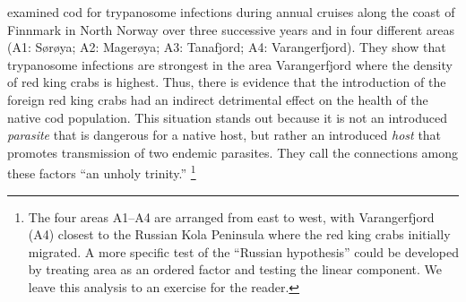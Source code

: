 \documentclass[11pt]{book}\usepackage[]{graphicx}\usepackage[]{color}
\begin{document}
\citet{Hemmingsen-etal:2005} examined cod for trypanosome infections during annual cruises along the coast of Finnmark in North Norway over three successive years and in four different areas
(A1: S{\o}r{\o}ya; A2: Mager{\o}ya; A3: Tanafjord; A4: Varangerfjord).
They show that trypanosome infections are strongest in the area Varangerfjord where the density of red king crabs is highest. Thus, there is evidence that the introduction of the foreign red king crabs had an indirect detrimental effect on the health of the native cod population. This situation stands out because it is not an introduced \emph{parasite} that is dangerous for a native host, but rather an introduced \emph{host} that promotes transmission of two endemic parasites. They call the connections among these factors ``an unholy trinity.''%
\footnote{\label{fn:russian}
The four areas A1--A4 are arranged from east to west, with Varangerfjord (A4) closest to the Russian
Kola Peninsula where the red king crabs initially migrated.  A more specific test of the
``Russian hypothesis'' could be developed by treating area as an ordered factor and testing
the linear component.  We leave this analysis to an exercise for the reader.
}
\end{document}
